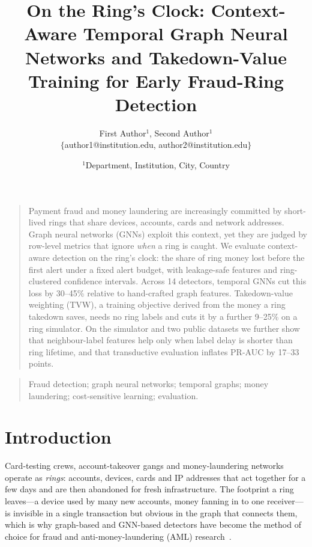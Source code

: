 \documentclass[10pt,letterpaper]{article}
\renewenvironment{abstract}{\begin{quote}\noindent {\small \bfseries \abstractname.} \small}{\medskip\noindent\end{quote}}
\newenvironment{keywords}{\begin{quote}\noindent {\small \bfseries Keywords: } \small}{\medskip\noindent\end{quote}}
\begin{document}
\title{On the Ring's Clock: Context-Aware Temporal Graph Neural Networks and Takedown-Value Training for Early Fraud-Ring Detection}

\author{
\normalsize First Author$^1$, Second Author$^1$ \\
\small $\lbrace$author1@institution.edu, author2@institution.edu$\rbrace$
\and
\small $^1$Department, Institution, City, Country
}
\date{}
\pagestyle{empty}
\maketitle
\thispagestyle{empty}
\vspace{-3.75em}

\begin{abstract}
Payment fraud and money laundering are increasingly committed by short-lived rings that share devices, accounts, cards and network addresses. Graph neural networks (GNNs) exploit this context, yet they are judged by row-level metrics that ignore \emph{when} a ring is caught. We evaluate context-aware detection on the ring's clock: the share of ring money lost before the first alert under a fixed alert budget, with leakage-safe features and ring-clustered confidence intervals. Across 14 detectors, temporal GNNs cut this loss by 30--45\% relative to hand-crafted graph features. Takedown-value weighting (TVW), a training objective derived from the money a ring takedown saves, needs no ring labels and cuts it by a further 9--25\% on a ring simulator. On the simulator and two public datasets we further show that neighbour-label features help only when label delay is shorter than ring lifetime, and that transductive evaluation inflates PR-AUC by 17--33 points.
\end{abstract}

\begin{keywords}
Fraud detection; graph neural networks; temporal graphs; money laundering; cost-sensitive learning; evaluation.
\end{keywords}

\section{Introduction}
Card-testing crews, account-takeover gangs and money-laundering networks operate as \emph{rings}: accounts, devices, cards and IP addresses that act together for a few days and are then abandoned for fresh infrastructure. The footprint a ring leaves---a device used by many new accounts, money fanning in to one receiver---is invisible in a single transaction but obvious in the graph that connects them, which is why graph-based and GNN-based detectors have become the method of choice for fraud and anti-money-laundering (AML) research~\cite{akoglu2015survey,ma2021gadsurvey,dou2020care,liu2021pcgnn,shi2022h2,weber2019elliptic,egressy2024multigraph}.
\end{document}
